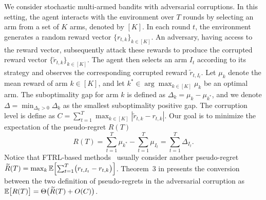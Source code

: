 We consider stochastic multi-armed bandits with adversarial corruptions. In this setting, the agent interacts with the environment over $T$ rounds by selecting an arm from a set of $K$ arms, denoted by $[K]$. In each round $t$, the environment generates a random reward vector $\{r_{t,k}\}_{k \in [K]}$. An adversary, having access to the reward vector, subsequently attack these rewards to produce the corrupted reward vector $\{\widetilde{r}_{t,k}\}_{k \in [K]}$. The agent then selects an arm $I_t$ according to its strategy and observes the corresponding corrupted reward $\widetilde{r}_{t,I_t}$. Let $\mu_k$ denote the mean reward of arm $k\in[K]$, and let $k^* \in \arg\max_{k \in [K]} \mu_k$
be an optimal arm. The suboptimality gap for arm $k$ is defined as  $\Delta_k = \mu_k - \mu_{k^*}$, and we denote $\Delta=\min_{\Delta_k>0}\Delta_k$ as the smallest suboptimality positive gap. The corruption level is define  as $C = \sum_{t=1}^T \max_{k \in [K]} \left| \widetilde{r}_{t,k} - r_{t,k} \right|$. %
Our goal is to minimize the expectation of the pseudo-regret $R(T)$
\[
R(T) = \sum_{t=1}^T \mu_{k^*} - \sum_{t=1}^T \mu_{I_t} = \sum_{t=1}^T \Delta_{I_t}.%
\]
Notice that FTRL-based methods~\citep{rouyer2022near,ito2022nearly,dann2023blackbox,zimmert2019beating,ito2021hybrid,tsuchiya2023further,Perchet_2016,gao2019batched,esfandiari2021regret} usually consider another pseudo-regret $\widetilde{R}(T) = \max_{k} {\mathbb{E}}\Bigl[\sum_{t=1}^T \bigl(r_{t,I_t} - r_{t,k}\bigr)\Bigr]$.
Theorem~3 in \citet{liu2021cooperative} presents the conversion between the two definition of pseudo-regrets in the adversarial corruption as
${\mathbb{E}}\bigl[R(T)\bigr] = \Theta\bigl(\widetilde{R}(T) + O(C)\bigr)$.
